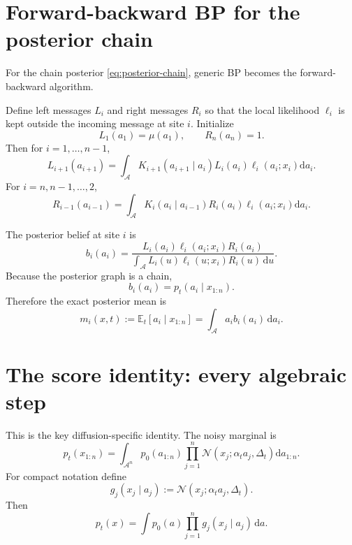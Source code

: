 \documentclass[11pt]{article}
\newcommand{\E}{\mathbb{E}}
\newcommand{\Normal}{\mathcal{N}}
\begin{document}
\section{Forward-backward BP for the posterior chain}

For the chain posterior \eqref{eq:posterior-chain}, generic BP becomes the forward-backward algorithm.

Define left messages \(L_i\) and right messages \(R_i\) so that the local likelihood \(\ell_i\) is kept outside the incoming message at site \(i\). Initialize
\begin{equation}
  L_1(a_1)=\mu(a_1),
  \qquad
  R_n(a_n)=1.
\end{equation}
Then for \(i=1,\ldots,n-1\),
\begin{equation}
  L_{i+1}(a_{i+1})
  =
  \int_{\mathcal A}
  K_{i+1}(a_{i+1}\mid a_i)
  L_i(a_i)\ell_i(a_i;x_i)
  \mathrm{d}a_i.
  \label{eq:left-message}
\end{equation}
For \(i=n,n-1,\ldots,2\),
\begin{equation}
  R_{i-1}(a_{i-1})
  =
  \int_{\mathcal A}
  K_i(a_i\mid a_{i-1})
  R_i(a_i)\ell_i(a_i;x_i)
  \mathrm{d}a_i.
  \label{eq:right-message}
\end{equation}

The posterior belief at site \(i\) is
\begin{equation}
  b_i(a_i)
  =
  \frac{L_i(a_i)\ell_i(a_i;x_i)R_i(a_i)}
  {\int_{\mathcal A} L_i(u)\ell_i(u;x_i)R_i(u)\,\mathrm{d}u}.
  \label{eq:chain-belief}
\end{equation}
Because the posterior graph is a chain,
\begin{equation}
  b_i(a_i)=p_t(a_i\mid x_{1:n}).
  \label{eq:belief-exact}
\end{equation}
Therefore the exact posterior mean is
\begin{equation}
  m_i(x,t)
  := \E_t[a_i\mid x_{1:n}]
  = \int_{\mathcal A} a_i b_i(a_i)\,\mathrm{d}a_i.
  \label{eq:posterior-mean}
\end{equation}

\section{The score identity: every algebraic step}

This is the key diffusion-specific identity. The noisy marginal is
\begin{equation}
  p_t(x_{1:n})
  = \int_{\mathcal A^n}
  p_0(a_{1:n})
  \prod_{j=1}^n \Normal(x_j;\alpha_t a_j,\Delta_t)
  \mathrm{d}a_{1:n}.
  \label{eq:noisy-marginal}
\end{equation}
For compact notation define
\begin{equation}
  g_j(x_j\mid a_j)
  := \Normal(x_j;\alpha_t a_j,\Delta_t).
\end{equation}
Then
\begin{equation}
  p_t(x) = \int p_0(a)\prod_{j=1}^n g_j(x_j\mid a_j)\,\mathrm{d}a.
\end{equation}
\end{document}
